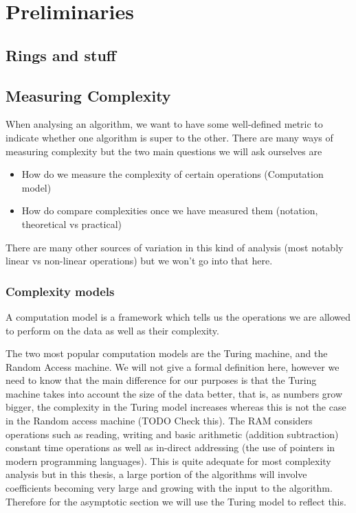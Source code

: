 \chapter{Preliminaries}\label{preliminaries}

\section{Rings and stuff}
\label{sec:prelim-rings}

\section{Measuring Complexity}%
\label{sec:Measuring Complexity}


When analysing an algorithm, we want to have some well-defined metric to indicate whether one algorithm is super to the other. There are many ways of measuring complexity but the two main questions we will ask ourselves are

\begin{itemize}
    \item How do we measure the complexity of certain operations (Computation model)
    \item How do compare complexities once we have measured them (notation, theoretical vs practical)
\end{itemize}

There are many other sources of variation in this kind of analysis (most notably linear vs non-linear operations) but we won't go into that here.

\subsection{Complexity models}%
\label{sub:Complexity models}

A computation model is a framework which tells us the operations we are allowed to perform on the data as well as their complexity. 

The two most popular computation models are the Turing machine, and the Random Access machine. We will not give a formal definition here, however we need to know that the main difference for our purposes is that the Turing machine takes into account the size of the data better, that is, as numbers grow bigger, the complexity in the Turing model increases whereas this is not the case in the Random access machine (TODO Check this). The RAM considers operations such as reading, writing and basic arithmetic (addition subtraction) constant time operations as well as in-direct addressing (the use of pointers in modern programming languages). This is quite adequate for most complexity analysis but in this thesis, a large portion of the algorithms will involve coefficients becoming very large and growing with the input to the algorithm. Therefore for the asymptotic section we will use the Turing model to reflect this.


